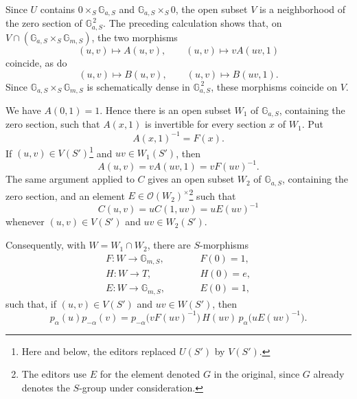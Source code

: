 Since \(U\) contains
\(0\times_S\mathbb G_{a,S}\) and
\(\mathbb G_{a,S}\times_S0\), the open subset \(V\) is a
neighborhood of the zero section of \(\mathbb G_{a,S}^{\,2}\).
The preceding calculation shows that, on
\(V\cap(\mathbb G_{a,S}\times_S\mathbb G_{m,S})\), the two
morphisms
\[
  (u,v)\longmapsto A(u,v),\qquad
  (u,v)\longmapsto vA(uv,1)
\]
coincide, as do
\[
  (u,v)\longmapsto B(u,v),\qquad
  (u,v)\longmapsto B(uv,1).
\]
Since
\(\mathbb G_{a,S}\times_S\mathbb G_{m,S}\) is schematically dense
in \(\mathbb G_{a,S}^{\,2}\), these morphisms coincide on \(V\).

We have \(A(0,1)=1\). Hence there is an open subset \(W_1\) of
\(\mathbb G_{a,S}\), containing the zero section, such that
\(A(x,1)\) is invertible for every section \(x\) of \(W_1\). Put
\[
  A(x,1)^{-1}=F(x).
\]
If \((u,v)\in V(S')\)\footnote{Here and below, the editors replaced
\(U(S')\) by \(V(S')\).} and \(uv\in W_1(S')\), then
\[
  A(u,v)=vA(uv,1)=vF(uv)^{-1}.
\]
The same argument applied to \(C\) gives an open subset \(W_2\)
of \(\mathbb G_{a,S}\), containing the zero section, and an
element \(E\in\mathscr O(W_2)^\times\)\footnote{The editors use
\(E\) for the element denoted \(G\) in the original, since \(G\)
already denotes the \(S\)-group under consideration.} such that
\[
  C(u,v)=uC(1,uv)=uE(uv)^{-1}
\]
whenever \((u,v)\in V(S')\) and \(uv\in W_2(S')\).

Consequently, with \(W=W_1\cap W_2\), there are \(S\)-morphisms
\[
\begin{array}{lll}
  F\colon W\to\mathbb G_{m,S},&\qquad&F(0)=1,\\
  H\colon W\to T,&&H(0)=e,\\
  E\colon W\to\mathbb G_{m,S},&&E(0)=1,
\end{array}
\]
such that, if \((u,v)\in V(S')\) and \(uv\in W(S')\), then
\begin{equation}\tag{+}
  p_\alpha(u)p_{-\alpha}(v)
    =p_{-\alpha}\bigl(vF(uv)^{-1}\bigr)\,
       H(uv)\,p_\alpha\bigl(uE(uv)^{-1}\bigr).
\end{equation}



